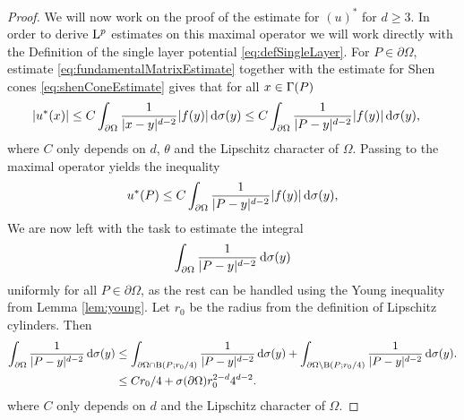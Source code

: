 \begin{proof}

  We will now work on the proof of the estimate for $(u)^*$ for $d \geq 3$.
  In order to derive $\mathrm{L}^p$ estimates on this maximal operator we will work directly with the Definition of the single layer potential \eqref{eq:defSingleLayer}.
  For $P \in \partial\Omega$, estimate \eqref{eq:fundamentalMatrixEstimate} together with the estimate for Shen cones \eqref{eq:shenConeEstimate} gives that for all $x \in \Gamma(P)$
  \begin{align*}
    |u^*(x)| 
    &\leq  C \int_{\partial\Omega} \frac{1}{|x - y|^{d - 2}} |f(y)| \, {\operatorname{d}\!{\sigma}}(y) 
    \leq  C \int_{\partial\Omega} \frac{1}{|P - y|^{d - 2}} |f(y)| \, {\operatorname{d}\!{\sigma}}(y),
  \end{align*}
  where $C$ only depends on $d$, $\theta$ and the Lipschitz character of $\Omega$.
  Passing to the maximal operator yields the inequality
  \begin{align*}
    u^*(P) \leq  C \int_{\partial\Omega} \frac{1}{|P - y|^{d - 2}} |f(y)| \, {\operatorname{d}\!{\sigma}}(y),
  \end{align*}
  We are now left with the task to estimate the integral 
  \begin{align*}
    \int_{\partial\Omega} \frac{1}{|P - y|^{d - 2}} \, {\operatorname{d}\!{\sigma}}(y)
  \end{align*}
  uniformly for all $P \in \partial\Omega$, as the rest can be handled using the Young inequality from Lemma \ref{lem:young}.
  Let $r_0$ be the radius from the definition of Lipschitz cylinders.
  Then
  \begin{align*}
    \int_{\partial\Omega} \frac{1}{|P - y|^{d - 2}} \, {\operatorname{d}\!{\sigma}}(y)
    &\leq \int_{\partial\Omega \cap \mathrm{B}(P; r_0/4)} \frac{1}{|P - y|^{d - 2}} \, {\operatorname{d}\!{\sigma}}(y) + \int_{\partial\Omega \setminus \mathrm{B}(P; r_0/4)} \frac{1}{|P - y|^{d - 2}} \, {\operatorname{d}\!{\sigma}}(y). \\
    & \leq C r_0/4 +  \sigma(\partial\Omega) r_0^{2 - d} 4^{d - 2}.
  \end{align*}
  where $C$ only depends on $d$ and the Lipschitz character of $\Omega$.
\end{proof}

